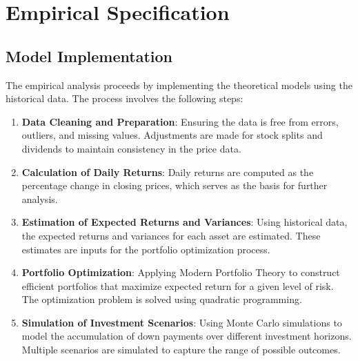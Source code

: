 \section{Empirical Specification}
\subsection{Model Implementation}
The empirical analysis proceeds by implementing the theoretical models using the historical data. The process involves the following steps:
\begin{enumerate}
    \item \textbf{Data Cleaning and Preparation}: Ensuring the data is free from errors, outliers, and missing values. Adjustments are made for stock splits and dividends to maintain consistency in the price data.
    \item \textbf{Calculation of Daily Returns}: Daily returns are computed as the percentage change in closing prices, which serves as the basis for further analysis.
    \item \textbf{Estimation of Expected Returns and Variances}: Using historical data, the expected returns and variances for each asset are estimated. These estimates are inputs for the portfolio optimization process.
    \item \textbf{Portfolio Optimization}: Applying Modern Portfolio Theory to construct efficient portfolios that maximize expected return for a given level of risk. The optimization problem is solved using quadratic programming.
    \item \textbf{Simulation of Investment Scenarios}: Using Monte Carlo simulations to model the accumulation of down payments over different investment horizons. Multiple scenarios are simulated to capture the range of possible outcomes.
\end{enumerate}

